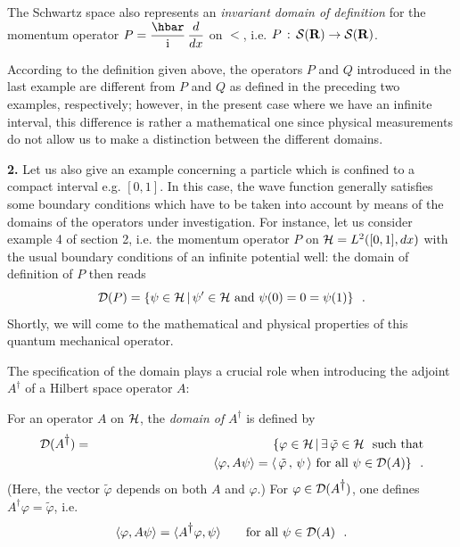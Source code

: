 \documentclass[12pt]{report}
\begin{document}
The Schwartz space also represents an 
{\em invariant domain of definition}
for the momentum operator 
$P = \ds{\hbar \over \ri} \, \ds{d \over
dx}$ on $\lt$, i.e. 
$P \, : \, \st \rightarrow \st$.

According to the definition given above, the operators $P$ and $Q$
introduced in the last example are  different
from $P$ and $Q$ as defined in the 
preceding two examples, respectively; however, 
in the present case where we have an infinite interval,  
this difference is rather 
 a mathematical one since
physical measurements do not allow us to make  
a distinction between the different domains. 

\medskip 
\noindent
{\bf 2.} 
Let us also give an example concerning a particle 
which is confined  
to a compact interval e.g. $[0,1 ]$. 
In this case, the wave 
function generally satisfies some boundary conditions
which have to be taken into account by means of the 
domains of the operators under investigation. 
For instance, let us consider example 4 of section 2, 
i.e. the momentum operator $P$ on  
$\hs =  L^2 ([0,1], dx)$ 
with the usual boundary conditions 
of an infinite potential well: 
the domain of definition of $P$ then reads  
\begin{equation}
\label{dir}
{\cal D} (P) = \{ \psi \in \hs \, | \,
\psi^{\prime} \in \hs \ {\rm and} \ \psi(0) = 0 = \psi(1) \}
\ \ .
\end{equation} 
Shortly, we will come to the mathematical and physical 
properties of this quantum mechanical operator. 

\bigskip 

The specification of the domain 
plays a crucial role when  
introducing the adjoint $A^{\dag}$ of a
Hilbert space operator
$A$:




\begin{defin}
For an operator $A$ on $\hs$, the 
{\em domain of} $A^{\dag}$
is defined by 
\begin{eqnarray*}
{\cal D} (A^{\dag}) & = & \{ \varphi \in \hs \, | \, \exists\,
\tilde{\varphi} \in \hs \ \ \mbox{such that}
\\
&& \qquad \qquad \qquad \qquad \quad
\left\langle \varphi , A \psi \right\rangle =
\langle \, \tilde \varphi  \, , \, \psi \, \rangle
\ \mbox{for all} \ \psi  \in {\cal D} (A) \}
\ \ .
\end{eqnarray*}
(Here, the vector $\tilde{\varphi}$
depends on both $A$ and  $\varphi$.)
For $\varphi \in {\cal D}(A^{\dag})$, one defines
$A^{\dag} \varphi = \tilde \varphi$, i.e.
\begin{equation}
\label{defa}
\langle \varphi , A \psi \rangle =
\langle A^{\dag} \varphi , \psi \rangle
\qquad \mbox{for all} \ \psi \in {\cal D}(A)
\ \ .
\end{equation}
\end{defin}
\end{document}
